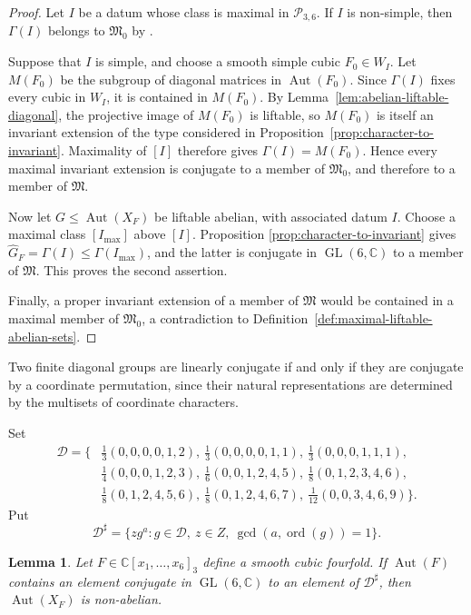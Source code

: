 \documentclass[12pt]{amsart}
\numberwithin{equation}{section}
\theoremstyle{plain}
\newtheorem{lem}[thm]{Lemma}
\theoremstyle{definition}
\theoremstyle{remark}
\newcommand{\CC}{\mathbb C}
\DeclareMathOperator{\Aut}{Aut}
\DeclareMathOperator{\GL}{GL}
\DeclareMathOperator{\ord}{ord}
\begin{document}
\begin{proof}
Let $I$ be a datum whose class is maximal in $\mathcal P_{3,6}$.  If $I$
is non-simple, then $\Gamma(I)$ belongs to $\mathfrak M_0$ by
\cite[Theorem~4.2(1)--(8)]{zheng2021liftableabelian}.

Suppose that $I$ is simple, and choose a smooth simple cubic
$F_0\in W_I$.  Let $M(F_0)$ be the subgroup of diagonal matrices in
$\Aut(F_0)$.  Since
$\Gamma(I)$ fixes every cubic in $W_I$, it is contained in $M(F_0)$.
By Lemma~\ref{lem:abelian-liftable-diagonal}, the projective image of
$M(F_0)$ is liftable, so $M(F_0)$ is itself an invariant extension of the
type considered in Proposition~\ref{prop:character-to-invariant}.
Maximality of $[I]$ therefore gives $\Gamma(I)=M(F_0)$.  Hence every
maximal invariant extension is conjugate to a member of $\mathfrak M_0$,
and therefore to a member of $\mathfrak M$.

Now let $G\leq\Aut(X_F)$ be liftable abelian, with associated datum $I$.
Choose a maximal class $[I_{\max}]$ above $[I]$.  Proposition
\ref{prop:character-to-invariant} gives
$\widehat G_F=\Gamma(I)\leq\Gamma(I_{\max})$, and the latter is conjugate
in $\GL(6,\CC)$ to a member of $\mathfrak M$.  This proves the second
assertion.

Finally, a proper invariant extension of a member of $\mathfrak M$ would be
contained in a maximal member of $\mathfrak M_0$, a contradiction to
Definition~\ref{def:maximal-liftable-abelian-sets}.
\end{proof}

Two finite diagonal groups are linearly conjugate if and only if they are
conjugate by a coordinate permutation, since their natural representations
are determined by the multisets of coordinate characters.

Set
\begin{align*}
\mathscr D=\biggl\{&
\frac13(0,0,0,0,1,2),\
\frac13(0,0,0,0,1,1),\
\frac13(0,0,0,1,1,1),\\
&\frac14(0,0,0,1,2,3),\
\frac16(0,0,1,2,4,5),\
\frac18(0,1,2,3,4,6),\\
&\frac18(0,1,2,4,5,6),\
\frac18(0,1,2,4,6,7),\
\frac1{12}(0,0,3,4,6,9)
\biggr\}.
\end{align*}
Put
\[
\mathscr D^\sharp
=\{zg^a:g\in\mathscr D,\ z\in Z,\ \gcd(a,\ord(g))=1\}.
\]

\begin{lem}\label{lem:dangerous-elements}
Let $F\in\CC[x_1,\ldots,x_6]_3$ define a smooth cubic fourfold.  If
$\Aut(F)$ contains an element conjugate in $\GL(6,\CC)$ to an element of
$\mathscr D^\sharp$, then $\Aut(X_F)$ is non-abelian.
\end{lem}
\end{document}
